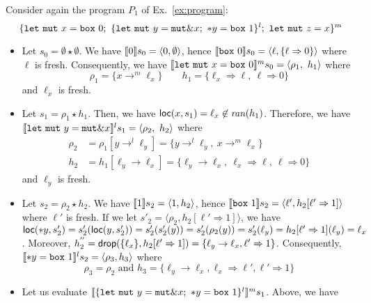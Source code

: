 \begin{example}
  Consider again the program $P_1$ of Ex.~\ref{ex:program}:
  \[
    \{
      \mathtt{let\ mut}\ x = \mathtt{box}\ 0;\
      \{\mathtt{let\ mut}\ y = \mathtt{mut}\borrow x;\
      \mathtt{*}y = \mathtt{box}\ 1\}^l;\
      \mathtt{let\ mut}\ z = x
    \}^m
  \]
  \begin{itemize}
    \item Let $s_0=\emptyset \star \emptyset$.
    We have $\den[0]{s_0} = \langle 0,\emptyset\rangle$, hence
    $\den[\mathtt{box}\ 0]{s_0} =
    \langle\ell,\{\ell\Rightarrow 0\}\rangle$ where $\ell$ is fresh.
    Consequently, we have
    $\denl[\mathtt{let\ mut}\ x = \mathtt{box}\ 0]{m}{s_0} =
    \langle \rho_1,\ h_1\rangle$ where
    \[\rho_1=\{x\to^m\ell_x\} \qquad
    h_1 = \{\ell_x\Rightarrow \ell,\ \ell\Rightarrow 0\}\]
    and $\ell_x$ is fresh.
    \item Let $s_1 = \rho_1 \star h_1$.
    Then, we have
    $\loc(x,s_1) = \ell_x \not\in\ran(h_1)$.
    Therefore, we have
    $\denl[\mathtt{let\ mut}\ y = \mathtt{mut}\borrow x]{l}{s_1} =
    \langle \rho_2,\ h_2\rangle$
    where
    \begin{align*}
      \rho_2 & = \rho_1[y\to^l\ell_y] = \{y\to^l\ell_y,\ x\to^m\ell_x\}\\
      h_2 & = h_1[\ell_y\to \ell_x] =
      \{\ell_y\to \ell_x,\ \ell_x\Rightarrow \ell,\ \ell\Rightarrow 0\}
    \end{align*}
    and $\ell_y$ is fresh.
    \item Let $s_2 = \rho_2 \star h_2$.
    We have $\den[1]{s_2} = \langle 1,h_2\rangle$, hence
    $\den[\mathtt{box}\ 1]{s_2} =
    \langle\ell',h_2[\ell'\Rightarrow 1]\rangle$ where $\ell'$ is fresh.
    If we let $s'_2=\langle\rho_2,h_2[\ell'\Rightarrow 1]\rangle$,
    we have $\loc(\mathtt{*}y,s'_2) = s'_2(\loc(y,s'_2)) =
    s'_2(s'_2(y)) = s'_2(\rho_2(y)) = s'_2(\ell_y) = h_2[\ell'\Rightarrow 1](\ell_y)
    = \ell_x$. Moreover, $h^{''}_2=\drop(\{\ell_x\},h_2[\ell'\Rightarrow 1]) =
    \{\ell_y\to \ell_x,\ell'\Rightarrow 1\}$. Consequently,
    $\denl[\mathtt{*}y = \mathtt{box}\ 1]{l}{s_2} =
    \langle\rho_3,h_3\rangle$ where
    \[\rho_3 = \rho_2
    \text{ and }
    h_3 = \{\ell_y\to\ell_x,\ell_x\Rightarrow\ell',
    \ell'\Rightarrow 1\}\]
    \item Let us evaluate
    $\denl[\{\mathtt{let\ mut}\ y = \mathtt{mut}\borrow x;\
    \mathtt{*}y = \mathtt{box}\ 1\}^l]{m}{s_1}$. Above, we have

\end{itemize}
\end{example}
